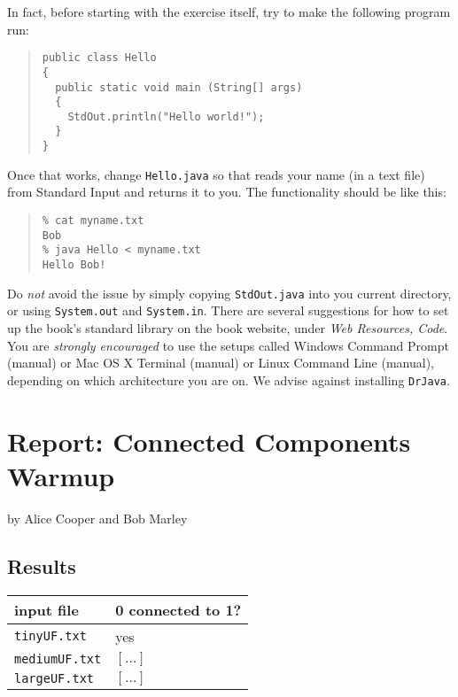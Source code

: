 \documentclass{tufte-handout}
\begin{document}
In fact, before starting with the exercise itself, try to make the following program run:

\begin{quotation}
\begin{verbatim}
public class Hello
{
  public static void main (String[] args)
  {
    StdOut.println("Hello world!");
  }
}
\end{verbatim}
\end{quotation}

Once that works, change {\tt Hello.java} so that reads your name (in a text file) from Standard Input and returns it to you.
The functionality should be like this:

\begin{quotation}
\begin{verbatim}
% cat myname.txt
Bob
% java Hello < myname.txt
Hello Bob!
\end{verbatim}
\end{quotation}

Do \emph{not} avoid the issue by simply copying {\tt StdOut.java} into you current directory, or using {\tt System.out} and {\tt System.in}.
There are several suggestions for how to set up the book's standard library on the book website, under \emph{Web Resources, Code}.
You are \emph{strongly encouraged} to use the setups called Windows Command Prompt (manual) or Mac OS X Terminal (manual) or Linux Command Line (manual), depending on which architecture you are on.
We advise against installing \texttt{DrJava}.

\newpage
\section{Report: Connected Components Warmup}


by Alice Cooper and Bob Marley


\subsection{Results}

\begin{tabular}{ll}
  \toprule
  input file & 0 connected to 1? \\
  \midrule
  {\tt tinyUF.txt} & yes \\
  {\tt mediumUF.txt} & $[\ldots]$ \\
  {\tt largeUF.txt} & $[\ldots]$ \\
  \bottomrule
\end{tabular}
\end{document}
